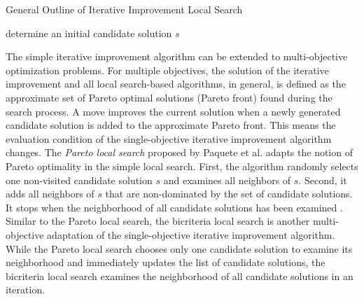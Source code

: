  \begin{algorithm}
  \caption{General Outline of Iterative Improvement Local Search}\label{alg:iterative-improvement}
    determine an initial candidate solution $s$
    
  \end{algorithm}
  
The simple iterative improvement algorithm can be extended to multi-objective optimization problems. For multiple objectives, the solution of the iterative improvement and all local search-based algorithms, in general, is defined as the approximate set of Pareto optimal solutions (Pareto front) found during the search process. A move improves the current solution when a newly generated candidate solution is added to the approximate Pareto front. This means the evaluation condition of the single-objective iterative improvement algorithm changes.
The \textit{Pareto local search} proposed by Paquete et al. \parencite{Paquete2004ParetoStudy} adapts the notion of Pareto optimality in the simple local search. First, the algorithm randomly selects one non-visited candidate solution $s$ and examines all neighbors of $s$. Second, it adds all neighbors of $s$ that are non-dominated by the set of candidate solutions. It stops when the neighborhood of all candidate solutions has been examined \parencite{Gonzalez2007HandbookMetaheuristics}. Similar to the Pareto local search, the bicriteria local search \parencite{Angel2004ApproximatingProblem} is another multi-objective adaptation of the single-objective iterative improvement algorithm. While the Pareto local search chooses only one candidate solution to examine its neighborhood and immediately updates the list of candidate solutions, the bicriteria local search examines the neighborhood of all candidate solutions in an iteration.



   
